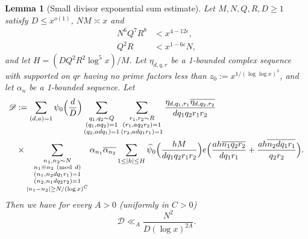\documentclass[10pt]{amsart}
\theoremstyle{plain}
\newtheorem{lmm}[thrm]{Lemma}
\numberwithin{equation}{section}
\newcommand{\Mod}[1]{\ (\mathrm{mod}\ #1)}
\renewcommand{\hat}[1]{\widehat #1}
\begin{document}
\begin{lmm}[Small divisor exponential sum estimate]\label{lmm:SmallDivisorExponential}
Let $M,N,Q,R,D\ge 1$ satisfy $D\le x^{o(1)}$, $NM\asymp x$ and
\begin{align*}
N^6 Q^{7} R^8&<x^{4-12\epsilon},\\
Q^2 R&<x^{1-6\epsilon} N,
\end{align*}
and let $H=(DQ^2R^2\log^5{x})/M$. Let $\eta_{d,q,r}$ be a 1-bounded complex sequence with supported on $qr$ having no prime factors less than $z_0:=x^{1/(\log\log{x})^3}$, and let $\alpha_n$ be a 1-bounded sequence. Let
\begin{align*}
\mathscr{D}&:=\sum_{\substack{ (d,a)=1}}\psi_0\Bigl(\frac{d}{D}\Bigr)\sum_{\substack{q_1,q_2\sim Q \\ (q_1,aq_2)=1\\ (q_2,a d q_1)=1}}\sum_{\substack{r_1,r_2\sim R\\ (r_1,aq_2 r_2)=1\\ (r_2,a d q_1 r_1)=1}}\frac{\eta_{d,q_1,r_1}\overline{\eta_{d,q_2,r_2}}}{d q_1 q_2 r_1 r_2}\\
&\times\sum_{\substack{n_1,n_2\sim N\\ n_1\equiv n_2\Mod{d}\\ (n_1,n_2 d q_1 r_1)=1\\(n_2,n_1 d q_2 r_2)=1\\ |n_1-n_2|\ge N/(\log{x})^C}}\alpha_{n_1}\overline{\alpha_{n_2}}\sum_{1\le |h|\le H}\hat{\psi}_0\Bigl(\frac{h M}{d q_1 q_2 r_1 r_2}\Bigr)e\Bigl(\frac{ah\overline{n_1 q_2 r_2}}{d q_1 r_1}+\frac{ah\overline{n_2 d q_1 r_1}}{q_2 r_2}\Bigr).
\end{align*}
Then we have for every $A>0$ (uniformly in $C>0$)
\[
\mathscr{D}\ll_A \frac{N^2}{D(\log{x})^{2A}}.
\]
\end{lmm}
%
%
%
%
\end{document}
